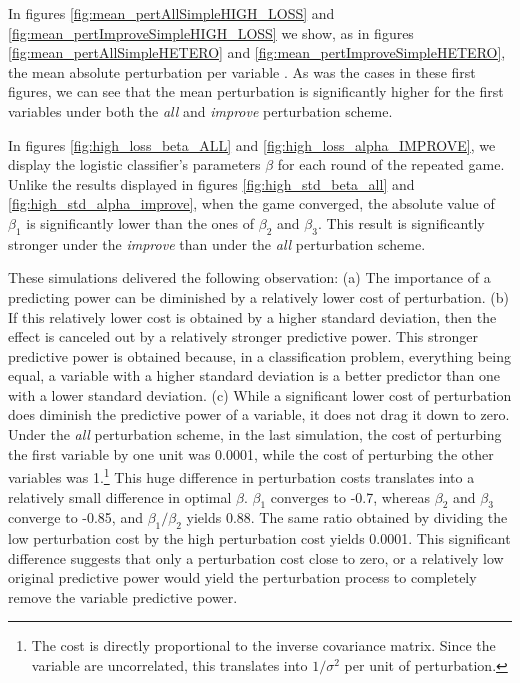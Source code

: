 \documentclass[12pt]{article} %
\begin{document}
In figures \ref{fig:mean_pertAllSimpleHIGH_LOSS} and \ref{fig:mean_pertImproveSimpleHIGH_LOSS} we show, as in figures \ref{fig:mean_pertAllSimpleHETERO} and \ref{fig:mean_pertImproveSimpleHETERO}, the mean absolute perturbation per variable . As was the cases in these first figures, we can see that the mean perturbation is significantly higher for the first variables under both the \textit{all} and \textit{improve} perturbation scheme. 

In figures \ref{fig:high_loss_beta_ALL} and \ref{fig:high_loss_alpha_IMPROVE}, we display the logistic classifier's parameters $\beta$ for each round of the repeated game. Unlike the results displayed in figures \ref{fig:high_std_beta_all} and \ref{fig:high_std_alpha_improve}, when the game converged, the absolute value of $\beta_1$ is significantly lower than the ones of $\beta_2$ and $\beta_3$. This result is significantly stronger under the \textit{improve} than under the \textit{all} perturbation scheme. 

These simulations delivered the following observation: (a) The importance of a predicting power can be diminished by a relatively lower cost of perturbation. (b) If this relatively lower cost is obtained by a higher standard deviation, then the effect is canceled out by a relatively stronger predictive power. This stronger predictive power is obtained because, in a classification problem, everything being equal, a variable with a higher standard deviation is a better predictor than one with a lower standard deviation. (c) While a significant lower cost of perturbation does diminish the predictive power of a variable, it does not drag it down to zero. Under the \textit{all} perturbation scheme, in the last simulation, the cost of perturbing the first variable by one unit was 0.0001, while the cost of perturbing the other variables was 1.\footnote{The cost is directly proportional to the inverse covariance matrix. Since the variable are uncorrelated, this translates into $1/\sigma^2$ per unit of perturbation.}
This huge difference in perturbation costs translates into a relatively small difference in optimal $\beta$. $\beta_1$ converges to -0.7, whereas $\beta_2$ and $\beta_3$ converge to -0.85, and  $\beta_1/\beta_2$ yields 0.88. The same ratio obtained by dividing the low perturbation cost by the high perturbation cost yields 0.0001. This significant difference suggests that only a perturbation cost close to zero, or a relatively low original predictive power would yield the perturbation process to completely remove the variable predictive power. 
\end{document}
